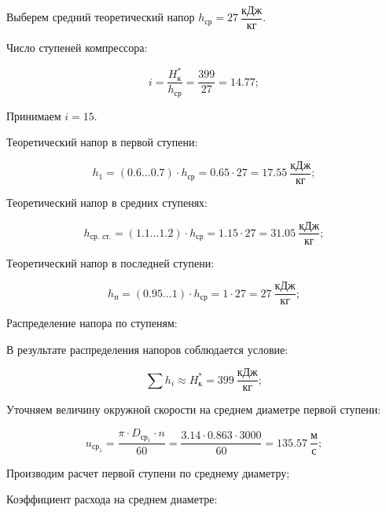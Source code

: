 Выберем средний теоретический напор $h_{\text{ср}}=27 \ \dfrac{\text{кДж}}{\text{кг}}$.

Число ступеней компрессора:

\begin{equation} \label{eu_eqn}
	i= \dfrac{H^*_{\text{к}}}{h_{\text{ср}}}=\dfrac{399}{27}=14.77;
\end{equation}

Принимаем $i=15$.

Теоретический напор в первой ступени:

\begin{equation} \label{eu_eqn}
	h_{1}=(0.6\dots 0.7)\cdot h_{\text{ср}}=0.65\cdot 27=17.55 \ \dfrac{\text{кДж}}{\text{кг}};
\end{equation}

Теоретический напор в средних ступенях:

\begin{equation} \label{eu_eqn}
	h_{\text{ср. ст.}}=(1.1\dots 1.2)\cdot h_{\text{ср}}=1.15\cdot 27=31.05 \ \dfrac{\text{кДж}}{\text{кг}};
\end{equation}

Теоретический напор в последней ступени:

\begin{equation} \label{eu_eqn}
	h_{п}=(0.95\dots 1)\cdot h_{\text{ср}}=1\cdot 27=27 \ \dfrac{\text{кДж}}{\text{кг}};
\end{equation}

Распределение напора по ступеням:


В результате распределения напоров соблюдается условие:

\begin{equation} \label{eu_eqn}
	\sum h_{i} \approx H^*_{\text{к}}=399 \ \dfrac{\text{кДж}}{\text{кг}};
\end{equation}

Уточняем величину окружной скорости на среднем диаметре первой ступени:

\begin{equation} \label{eu_eqn}
	u_{\text{ср}_{1}}=\dfrac{\pi\cdot D_{\text{ср}_{1}}\cdot n}{60}=\dfrac{3.14\cdot 0.863\cdot 3000}{60}=135.57 \ \dfrac{\text{м}}{\text{с}};
\end{equation}

Производим расчет первой ступени по среднему диаметру;

Коэффициент расхода на среднем диаметре:

